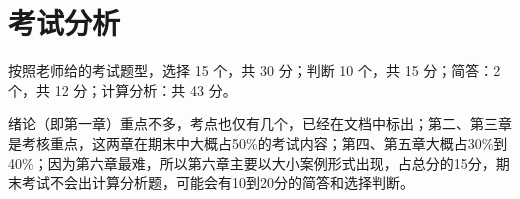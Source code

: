 \chapter{考试分析}
按照老师给的考试题型，选择 15 个，共 30 分；判断 10 个，共 15 分；简答：2 个，共 12 分；计算分析：共 43 分。

绪论（即第一章）重点不多，考点也仅有几个，已经在文档中标出；第二、第三章是考核重点，这两章在期末中大概占50\%的考试内容；第四、第五章大概占30\%到40\%；因为第六章最难，所以第六章主要以大小案例形式出现，占总分的15分，期末考试不会出计算分析题，可能会有10到20分的简答和选择判断。